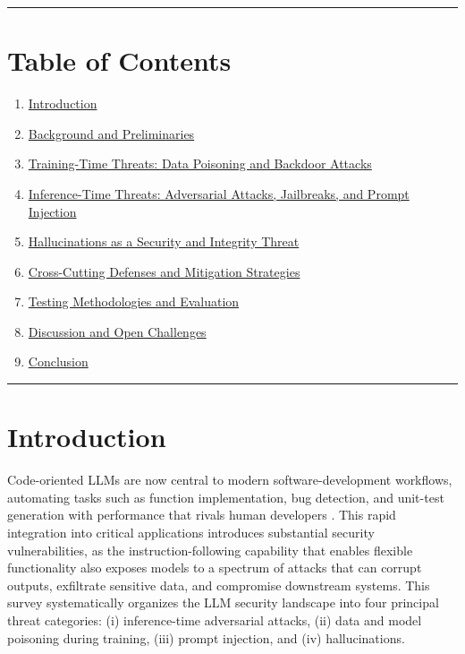 \documentclass[11pt,a4paper]{article}
\begin{document}
\noindent\rule{\textwidth}{0.4pt}
\section{Table of Contents}

\begin{enumerate}
  \item \href{#introduction}{Introduction}
  \item \href{#background-and-preliminaries}{Background and Preliminaries}
  \item \href{#training-time-threats-data-poisoning-and-backdoor-attacks}{Training-Time Threats: Data Poisoning and Backdoor Attacks}
  \item \href{#inference-time-threats-adversarial-attacks-jailbreaks-and-prompt-injection}{Inference-Time Threats: Adversarial Attacks, Jailbreaks, and Prompt Injection}
  \item \href{#hallucinations-as-a-security-and-integrity-threat}{Hallucinations as a Security and Integrity Threat}
  \item \href{#cross-cutting-defenses-and-mitigation-strategies}{Cross-Cutting Defenses and Mitigation Strategies}
  \item \href{#testing-methodologies-and-evaluation}{Testing Methodologies and Evaluation}
  \item \href{#discussion-and-open-challenges}{Discussion and Open Challenges}
  \item \href{#conclusion}{Conclusion}
\end{enumerate}
\noindent\rule{\textwidth}{0.4pt}
\section{Introduction}

Code-oriented LLMs are now central to modern software-development workflows, automating tasks such as function implementation, bug detection, and unit-test generation with performance that rivals human developers \cite{Mo_2025_LLMs_eccb86af}. This rapid integration into critical applications introduces substantial security vulnerabilities, as the instruction-following capability that enables flexible functionality also exposes models to a spectrum of attacks that can corrupt outputs, exfiltrate sensitive data, and compromise downstream systems. This survey systematically organizes the LLM security landscape into four principal threat categories: (i) inference-time adversarial attacks, (ii) data and model poisoning during training, (iii) prompt injection, and (iv) hallucinations.
\end{document}
